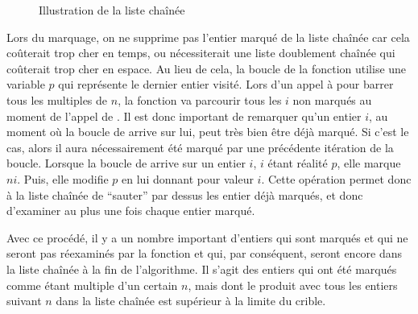 \documentclass[a4paper]{easychair}
\newcommand\arr[1]{\ocamlf{arr[}#1\ocamlf{]}}
\begin{document}
\begin{figure}[h]
\caption{Illustration de la liste chaînée}
\end{figure}
Lors du marquage, on ne supprime pas l'entier marqué de la liste chaînée car
cela coûterait trop cher en temps, ou nécessiterait une liste doublement
chaînée qui coûterait trop cher en espace.
Au lieu de cela, la boucle de la fonction 
utilise une variable $p$ qui représente le dernier entier visité.
Lors d'un appel à  pour barrer tous les multiples de $n$,
la fonction va parcourir tous les $i$ non marqués au moment de l'appel de
. Il est donc important de remarquer qu'un entier $i$,
au moment où la boucle de  arrive sur lui, peut très bien
être déjà marqué. Si c'est le cas, alors il aura nécessairement été marqué par
une précédente itération de la boucle.
Lorsque la boucle de  arrive sur un entier $i$,
$i$ étant réalité \arr{$p$}, elle marque $ni$.
Puis, elle modifie \arr{$p$} en lui donnant pour valeur \arr{$i$}.
Cette opération permet donc à la liste chaînée de ``sauter'' par dessus
les entier déjà marqués, et donc d'examiner au plus une fois chaque entier marqué.

Avec ce procédé, il y a un nombre important d'entiers qui sont marqués et qui ne
seront pas réexaminés par la fonction  et qui,
par conséquent, seront encore dans la liste chaînée à la fin de l'algorithme.
Il s'agit des entiers qui ont été marqués comme étant multiple d'un certain $n$,
mais dont le produit avec tous les entiers suivant $n$ dans la liste chaînée est
supérieur à la limite du crible.
\end{document}
